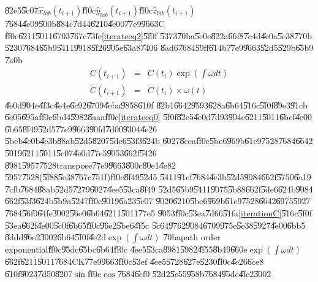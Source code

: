 \documentclass[12pt,a4paper]{article}
\begin{document}
\U{82e5}\U{5c07}$\hat{x}_{lab}\left( t_{i+1}\right) $\U{ff0c}$\hat{y}%
_{lab}\left( t_{i+1}\right) $\U{ff0c}$\hat{z}_{lab}\left( t_{i+1}\right) $%
\U{7684}\U{4e09}\U{500b}\U{884c}\U{7d44}\U{6210}\U{4e00}\U{77e9}\U{9663}C%
\U{ff0c}\U{6211}\U{5011}\U{6703}\U{767c}\U{73fe}\ref{iterateeq2}\U{5f0f}%
\U{5373}\U{70ba}\U{5c0e}\U{822a}\U{66f8}\U{7c4d}\U{4e0a}\U{5e38}\U{770b}%
\U{5230}\U{7684}\U{65b9}\U{5411}\U{9918}\U{5f26}\U{905e}\U{63a8}\U{7406}%
\U{8ad6}\U{7684}\U{59ff}\U{614b}\U{77e9}\U{9663}\U{52d5}\U{529b}\U{65b9}%
\U{7a0b}\cite{titterton}%
\begin{eqnarray}
C(t_{i+1}) &=&C(t_{i})\exp (\int \omega dt)  \label{iterationC} \\
\dot{C}(t_{i+1}) &=&C(t_{i})\times \omega (t)
\end{eqnarray}%
\U{4e0d}\U{904e}\U{4f3c}\U{4e4e}\U{6c92}\U{6709}\U{4eba}\U{9858}\U{610f}%
\U{82b1}\U{6642}\U{9593}\U{628a}\U{6b64}\U{516c}\U{5f0f}\U{89e3}\U{91cb}%
\U{6e05}\U{695a}\U{ff0c}\U{6bd4}\U{5982}\U{8aaa}\U{ff0c}\ref{iterateeq0}%
\U{5f0f}\U{82e5}\U{4e0d}\U{7d93}\U{904e}\U{6211}\U{5011}\U{6bcf}\U{4e00}%
\U{6b65}\U{8f49}\U{52d5}\U{77e9}\U{9663}\U{90fd}\U{7d00}\U{9304}\U{4e26}%
\U{5beb}\U{4e0b}\U{4e3b}\U{88ab}\U{52d5}\U{8207}\U{5de6}\U{53f3}\U{624b}%
\U{6027}\U{8cea}\U{ff0c}\U{5be6}\U{969b}\U{61c9}\U{7528}\U{7684}\U{6642}%
\U{5019}\U{6211}\U{5011}\U{5c07}\U{4e0d}\U{77e5}\U{9053}\U{662f}\U{5426}%
\U{8981}\U{5957}\U{7528}transpose\U{77e9}\U{9663}\U{800c}\U{80e1}\U{4e82}%
\U{5957}\U{7528}(\U{5f88}\U{5e38}\U{767c}\U{751f})\U{ff0c}\U{8f49}\U{52d5}%
\U{5411}\U{91cf}\U{7684}\U{4e3b}\U{52d5}\U{9084}\U{662f}\U{5750}\U{6a19}%
\U{7cfb}\U{7684}\U{88ab}\U{52d5}\U{7279}\U{6027}\U{4ee5}\U{53ca}\U{8f49}%
\U{52d5}\U{65b9}\U{5411}\U{9075}\U{5b88}\U{662f}\U{5de6}\U{624b}\U{9084}%
\U{662f}\U{53f3}\U{624b}\U{5b9a}\U{5247}\U{ff0c}\U{9019}\U{6a23}\U{5c07}%
\U{9020}\U{6210}\U{5be6}\U{969b}\U{61c9}\U{7528}\U{6642}\U{6975}\U{5927}%
\U{7684}\U{56f0}\U{64fe}\U{3002}\U{56e0}\U{6b64}\U{6211}\U{5011}\U{77e5}%
\U{9053}\U{ff0c}\U{53ea}\U{7d66}\U{51fa}\ref{iterationC}\U{516c}\U{5f0f}%
\U{53ea}\U{662f}\U{4e00}\U{5c0f}\U{6b65}\U{ff0c}\U{96e2}\U{5be6}\U{4f5c}%
\U{5c64}\U{9762}\U{9084}\U{6709}\U{975e}\U{5e38}\U{5927}\U{4e00}\U{6bb5}%
\U{8ddd}\U{96e2}\U{3002}\U{6b64}\U{5f0f}\U{4e2d}$\exp (\int \omega dt)$%
\U{70ba}path order exponential\U{ff0c}\U{95dc}\U{65bc}\U{6b64}\U{ff0c}%
\U{4ee5}\U{53ca}\U{8981}\U{5982}\U{4f55}\U{8b49}\U{660e}$\exp (\int \omega
dt)$\U{662f}\U{6211}\U{5011}\U{7684}CK\U{77e9}\U{9663}\U{ff0c}\U{53ef}%
\U{4ee5}\U{5728}\cite[Page 49]{tong}\U{627e}\U{5230}\U{ff0c}\U{4e26}\U{6ce8}%
\U{610f}\U{9023}\U{7d50}\U{8207}$\sin $\U{ff0c}$\cos $\U{7684}\U{6cf0}%
\U{52d2}\U{5c55}\U{958b}\U{7684}\U{95dc}\U{4fc2}\U{3002}
\end{document}

